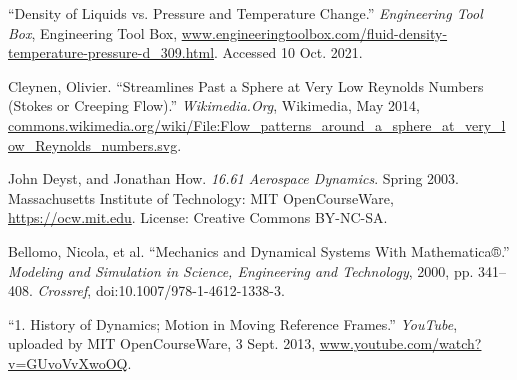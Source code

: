 
\begin{thebibliography}{12}


“Density of Liquids vs. Pressure and Temperature Change.” \emph{Engineering Tool Box}, Engineering Tool Box, \url{www.engineeringtoolbox.com/fluid-density-temperature-pressure-d_309.html}. Accessed 10 Oct. 2021.


Cleynen, Olivier. “Streamlines Past a Sphere at Very Low Reynolds Numbers (Stokes or Creeping Flow).” \emph{Wikimedia.Org}, Wikimedia, May 2014, \url{commons.wikimedia.org/wiki/File:Flow_patterns_around_a_sphere_at_very_low_Reynolds_numbers.svg}.



John Deyst, and Jonathan How. \emph{16.61 Aerospace Dynamics}. Spring 2003. Massachusetts Institute of Technology: MIT OpenCourseWare, \url{https://ocw.mit.edu}. License: Creative Commons BY-NC-SA.



Bellomo, Nicola, et al. “Mechanics and Dynamical Systems With Mathematica®.” \emph{Modeling and Simulation in Science, Engineering and Technology}, 2000, pp. 341–408. \emph{Crossref}, doi:10.1007/978-1-4612-1338-3.

“1. History of Dynamics; Motion in Moving Reference Frames.” \emph{YouTube}, uploaded by MIT OpenCourseWare, 3 Sept. 2013, \url{www.youtube.com/watch?v=GUvoVvXwoOQ}.


\end{thebibliography}
